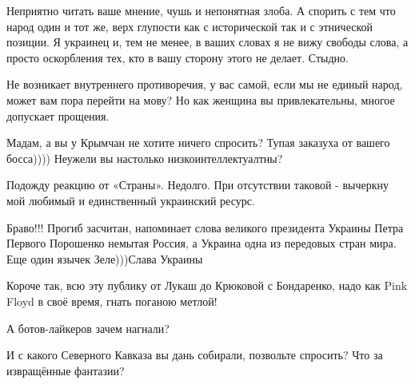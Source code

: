 \begin{itemize}
Неприятно читать ваше мнение, чушь и непонятная злоба. А спорить с тем что народ один и тот же, верх глупости как с исторической так и с этнической позиции. Я украинец и, тем не менее, в ваших словах я не вижу свободы слова, а просто оскорбления тех, кто в вашу сторону этого не делает. Стыдно.

 
Не возникает внутреннего противоречия, у вас самой, если мы не единый народ,
может вам пора перейти на мову? Но как женщина вы привлекательны, многое
допускает прощения.

 
Мадам, а вы у Крымчан не хотите ничего спросить? Тупая заказуха от вашего босса)))) Неужели вы настолько низкоинтеллектуалтны?

 
Подожду реакцию от «Страны». Недолго. При отсутствии таковой - вычеркну мой любимый и единственный украинский ресурс.


Браво!!! Прогиб засчитан, напоминает слова великого президента Украины Петра
Первого Порошенко немытая Россия, а Украина одна из передовых стран мира. Еще
один язычек Зеле)))Слава Украины

 
Короче так, всю эту публику от Лукаш до Крюковой с Бондаренко, надо как Pink
Floyd в своё время, гнать поганою метлой!

 
А ботов-лайкеров зачем нагнали?

\begin{itemize}
 
И с какого Северного Кавказа вы дань собирали, позвольте спросить? Что за извращённые фантазии? \Laughey[1.0][white]
\end{itemize}


\end{itemize}
